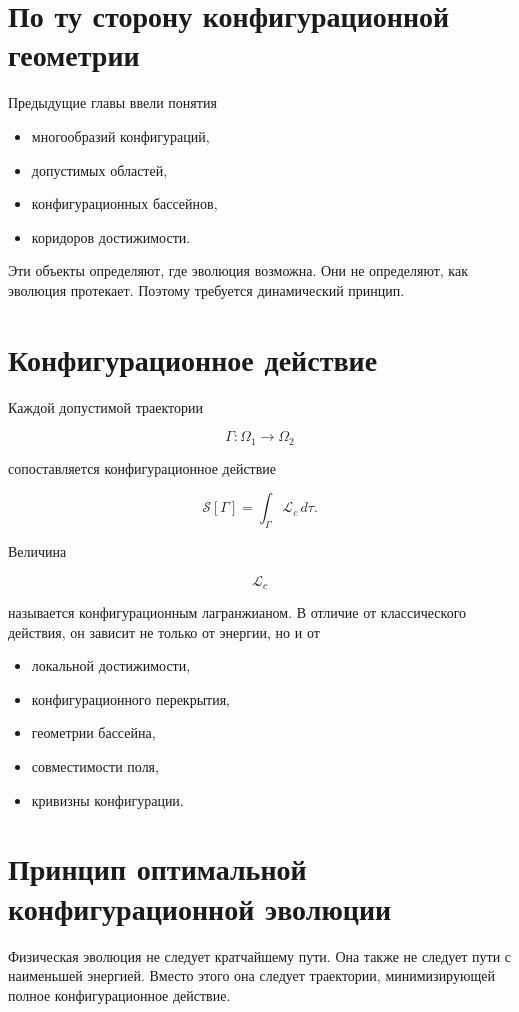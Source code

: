 \section{По ту сторону конфигурационной геометрии}

Предыдущие главы ввели понятия

\begin{itemize}
\item многообразий конфигураций,
\item допустимых областей,
\item конфигурационных бассейнов,
\item коридоров достижимости.
\end{itemize}

Эти объекты определяют, где эволюция возможна. Они не определяют, как эволюция протекает. Поэтому требуется динамический принцип.

\section{Конфигурационное действие}

Каждой допустимой траектории

\[ \Gamma : \Omega_1 \rightarrow \Omega_2 \]

сопоставляется конфигурационное действие

\[ \boxed{ \mathcal S[\Gamma] = \int_\Gamma \mathcal L_c \,d\tau. } \]

Величина

\[ \mathcal L_c \]

называется конфигурационным лагранжианом. В отличие от классического действия, он зависит не только от энергии, но и от

\begin{itemize}
\item локальной достижимости,
\item конфигурационного перекрытия,
\item геометрии бассейна,
\item совместимости поля,
\item кривизны конфигурации.
\end{itemize}

\section{Принцип оптимальной конфигурационной эволюции}

Физическая эволюция не следует кратчайшему пути. Она также не следует пути с наименьшей энергией. Вместо этого она следует траектории, минимизирующей полное конфигурационное действие.

